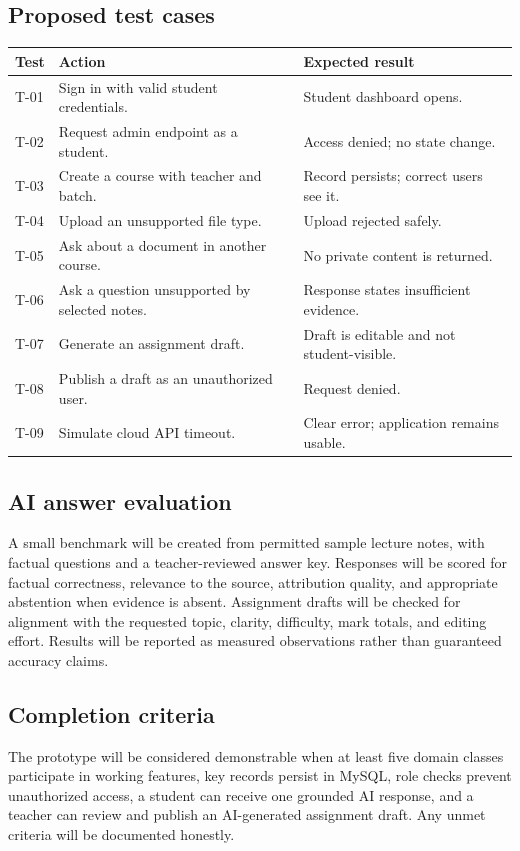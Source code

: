 \documentclass[11pt,a4paper]{article}
\begin{document}
\subsection{Proposed test cases}
\begin{longtable}{p{}p{}p{}}
\toprule Test & Action & Expected result\\\midrule\endhead
T-01 & Sign in with valid student credentials. & Student dashboard opens.\\
T-02 & Request admin endpoint as a student. & Access denied; no state change.\\
T-03 & Create a course with teacher and batch. & Record persists; correct users see it.\\
T-04 & Upload an unsupported file type. & Upload rejected safely.\\
T-05 & Ask about a document in another course. & No private content is returned.\\
T-06 & Ask a question unsupported by selected notes. & Response states insufficient evidence.\\
T-07 & Generate an assignment draft. & Draft is editable and not student-visible.\\
T-08 & Publish a draft as an unauthorized user. & Request denied.\\
T-09 & Simulate cloud API timeout. & Clear error; application remains usable.\\
\bottomrule
\end{longtable}
\subsection{AI answer evaluation}
A small benchmark will be created from permitted sample lecture notes, with factual questions and a teacher-reviewed answer key. Responses will be scored for factual correctness, relevance to the source, attribution quality, and appropriate abstention when evidence is absent. Assignment drafts will be checked for alignment with the requested topic, clarity, difficulty, mark totals, and editing effort. Results will be reported as measured observations rather than guaranteed accuracy claims.
\subsection{Completion criteria}
The prototype will be considered demonstrable when at least five domain classes participate in working features, key records persist in MySQL, role checks prevent unauthorized access, a student can receive one grounded AI response, and a teacher can review and publish an AI-generated assignment draft. Any unmet criteria will be documented honestly.
\end{document}
